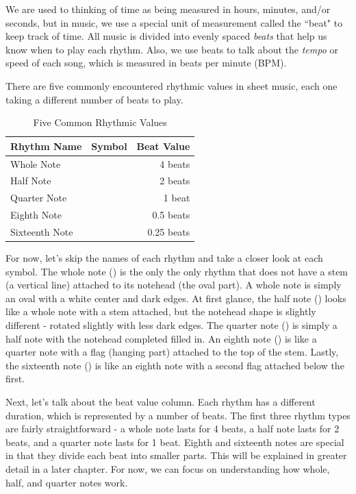 
We are used to thinking of time as being measured in hours, minutes, and/or seconds, but in music, we use a special unit of measurement called the ``beat" to keep track of time. All music is divided into evenly spaced \textit{beats} that help us know when to play each rhythm. Also, we use beats to talk about the \textit{tempo} or speed of each song, which is measured in beats per minute (BPM). 

There are five commonly encountered rhythmic values in sheet music, each one taking a different number of beats to play. 

\begin{table}[h]
	\large
	\centering
	\caption{Five Common Rhythmic Values}
	\label{tab:booktabs_example}
	\begin{tabular}{lcr}
		\toprule
		\textbf{Rhythm Name} & \textbf{Symbol} & \textbf{Beat Value} \\ 
		\midrule
		Whole Note       & \wholeNote       & 4 beats         \\
		Half Note        & \halfNote        & 2 beats         \\
		Quarter Note     & \quarterNote     & 1 beat          \\
		Eighth Note		 & \eighthNote	    & 0.5 beats		  \\
		Sixteenth Note   & \sixteenthNote   & 0.25 beats      \\
		\bottomrule
	\end{tabular}
\end{table}

For now, let's skip the names of each rhythm and take a closer look at each symbol. The whole note (\wholeNote) is the only the only rhythm that does not have a stem (a vertical line) attached to its notehead (the oval part). A whole note is simply an oval with a white center and dark edges. At first glance, the half note (\halfNote) looks like a whole note with a stem attached, but the notehead shape is slightly different - rotated slightly with less dark edges. The quarter note (\quarterNote) is simply a half note with the notehead completed filled in. An eighth note (\eighthNote) is like a quarter note with a flag (hanging part) attached to the top of the stem. Lastly, the sixteenth note (\sixteenthNote) is like an eighth note with a second flag attached below the first.

Next, let's talk about the beat value column. Each rhythm has a different duration, which is represented by a number of beats. The first three rhythm types are fairly straightforward - a whole note lasts for 4 beats, a half note lasts for 2 beats, and a quarter note lasts for 1 beat. Eighth and sixteenth notes are special in that they divide each beat into smaller parts. This will be explained in greater detail in a later chapter. For now, we can focus on understanding how whole, half, and quarter notes work.


